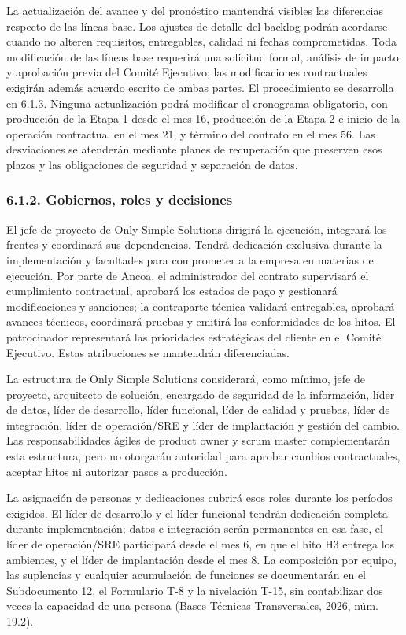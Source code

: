 \documentclass[11pt]{article}
\begin{document}
La actualización del avance y del pronóstico mantendrá visibles las
diferencias respecto de las líneas base. Los ajustes de detalle del
backlog podrán acordarse cuando no alteren requisitos, entregables,
calidad ni fechas comprometidas. Toda modificación de las líneas base
requerirá una solicitud formal, análisis de impacto y aprobación previa
del Comité Ejecutivo; las modificaciones contractuales exigirán además
acuerdo escrito de ambas partes. El procedimiento se desarrolla en
6.1.3. Ninguna actualización podrá modificar el cronograma obligatorio,
con producción de la Etapa 1 desde el mes 16, producción de la Etapa 2 e
inicio de la operación contractual en el mes 21, y término del contrato
en el mes 56. Las desviaciones se atenderán mediante planes de
recuperación que preserven esos plazos y las obligaciones de seguridad y
separación de datos.

\subsubsection{6.1.2. Gobiernos, roles y decisiones}\label{6-1-2-gobiernos-roles-y-decisiones}

El jefe de proyecto de Only Simple Solutions dirigirá la ejecución, integrará los frentes y coordinará sus dependencias. Tendrá dedicación exclusiva durante la implementación y facultades para comprometer a la empresa en materias de ejecución. Por parte de Ancoa, el administrador del contrato supervisará el cumplimiento contractual, aprobará los estados de pago y gestionará modificaciones y sanciones; la contraparte técnica validará entregables, aprobará avances técnicos, coordinará pruebas y emitirá las conformidades de los hitos. El patrocinador representará las prioridades estratégicas del cliente en el Comité Ejecutivo. Estas atribuciones se mantendrán diferenciadas.

La estructura de Only Simple Solutions considerará, como mínimo, jefe de
proyecto, arquitecto de solución, encargado de seguridad de la
información, líder de datos, líder de desarrollo, líder funcional, líder
de calidad y pruebas, líder de integración, líder de operación/SRE y
líder de implantación y gestión del cambio. Las responsabilidades ágiles
de product owner y scrum master complementarán esta estructura, pero no
otorgarán autoridad para aprobar cambios contractuales, aceptar hitos ni
autorizar pasos a producción.

La asignación de personas y dedicaciones cubrirá esos roles durante los
períodos exigidos. El líder de desarrollo y el líder funcional tendrán
dedicación completa durante implementación; datos e integración serán
permanentes en esa fase, el líder de operación/SRE participará desde el mes 6, en que el hito H3 entrega los ambientes, y el líder de implantación desde el mes 8. La composición por
equipo, las suplencias y cualquier acumulación de funciones se
documentarán en el Subdocumento 12, el Formulario T-8 y la nivelación
T-15, sin contabilizar dos veces la capacidad de una persona (Bases
Técnicas Transversales, 2026, núm. 19.2).
\end{document}
